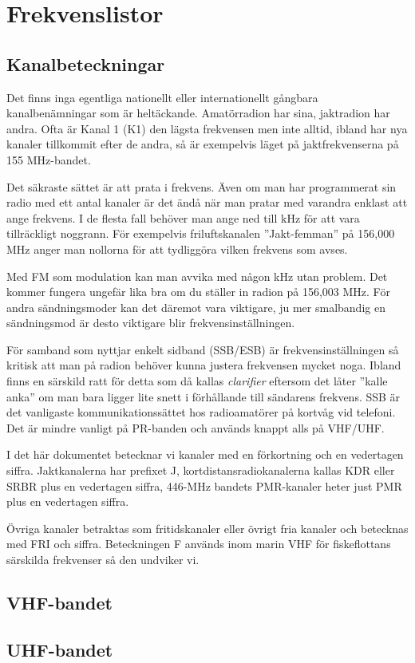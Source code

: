 \chapter{Frekvenslistor}
\label{kap:frekvenslistor}

\section{Kanalbeteckningar}

Det finns inga egentliga nationellt eller internationellt gångbara kanalbenämningar som är heltäckande. Amatörradion har sina, jaktradion har andra. Ofta är Kanal 1 (K1) den lägsta frekvensen men inte alltid, ibland har nya kanaler tillkommit efter de andra, så är exempelvis läget på jaktfrekvenserna på 155 MHz-bandet.

Det säkraste sättet är att prata i frekvens. Även om man har programmerat sin radio med ett antal kanaler är det ändå när man pratar med varandra enklast att ange frekvens. I de flesta fall behöver man ange ned till kHz för att vara tillräckligt noggrann. För exempelvis friluftskanalen ''Jakt-femman'' på 156,000 MHz anger man nollorna för att tydliggöra vilken frekvens som avses.

Med FM som modulation kan man avvika med någon kHz utan problem. Det kommer fungera ungefär lika bra om du ställer in radion på 156,003 MHz. För andra sändningsmoder kan det däremot vara viktigare, ju mer smalbandig en sändningsmod är desto viktigare blir frekvensinställningen.

För samband som nyttjar enkelt sidband (SSB/ESB) är frekvensinställningen så kritisk att man på radion behöver kunna justera frekvensen mycket noga. Ibland finns en särskild ratt för detta som då kallas \textit{clarifier} eftersom det låter ''kalle anka'' om man bara ligger lite snett i förhållande till sändarens frekvens. SSB är det vanligaste kommunikationssättet hos radioamatörer på kortvåg vid telefoni. Det är mindre vanligt på PR-banden och används knappt alls på VHF/UHF.

I det här dokumentet betecknar vi kanaler med en förkortning och en vedertagen siffra. Jaktkanalerna har prefixet J, kortdistansradiokanalerna kallas KDR eller SRBR plus en vedertagen siffra, 446-MHz bandets PMR-kanaler heter just PMR plus en vedertagen siffra.

Övriga kanaler betraktas som fritidskanaler eller övrigt fria kanaler och betecknas med FRI och siffra. Beteckningen F används inom marin VHF för fiskeflottans särskilda frekvenser så den undviker vi.

\section{VHF-bandet}

\section{UHF-bandet}

